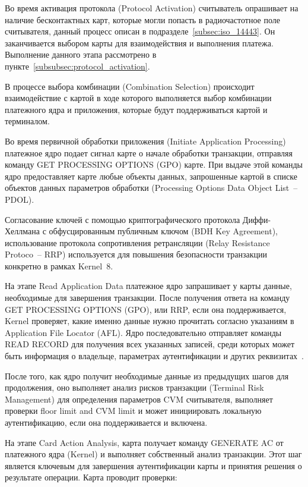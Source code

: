 Во время активация протокола (Protocol Activation) считыватель опрашивает на наличие бесконтактных карт, которые могли попасть в радиочастотное поле считывателя, данный процесс описан в подразделе~\ref{subsec:iso_14443}.
Он заканчивается выбором карты для взаимодействия и выполнения платежа.
Выполнение данного этапа рассмотрено в пункте~\ref{subsubsec:protocol_activation}.

В процессе выбора комбинации (Combination Selection) происходит взаимодействие с картой в ходе которого выполняется выбор комбинации платежного ядра и приложения, которые будут поддерживаться картой и терминалом.

Во время первичной обработки приложения (Initiate Application Processing) платежное ядро подает сигнал карте о начале обработки транзакции, отправляя команду GET PROCESSING OPTIONS (GPO) карте.
При выдаче этой команды ядро предоставляет карте любые объекты данных, запрошенные картой в списке объектов данных параметров обработки (Processing Options Data Object List~-- PDOL).

Согласование ключей с помощью криптографического протокола Диффи-Хеллмана с обфусцированным публичным ключом (BDH Key Agreement), использование протокола сопротивления ретрансляции (Relay Resistance Protoco~-- RRP) используется для повышения безопасности транзакции конкретно в рамках Kernel~8.

На этапе Read Application Data платежное ядро запрашивает у карты данные, необходимые для завершения транзакции.
После получения ответа на команду GET PROCESSING OPTIONS (GPO), или RRP, если она поддерживается, Kernel проверяет, какие именно данные нужно прочитать согласно указаниям в Application File Locator (AFL).
Ядро последовательно отправляет команды READ RECORD для получения всех указанных записей, среди которых может быть информация о владельце, параметрах аутентификации и других реквизитах~\cite{emv_book_c8}.

После того, как ядро получит необходимые данные из предыдущих шагов для продолжения, оно выполняет анализ рисков транзакции (Terminal Risk Management) для определения параметров CVM считывателя, выполняет проверки floor limit and CVM limit и может инициировать локальную аутентификацию, если она поддерживается и включена.

На этапе Card Action Analysis, карта получает команду GENERATE AC от платежного ядра (Kernel) и выполняет собственный анализ транзакции.
Этот шаг является ключевым для завершения аутентификации карты и принятия решения о результате операции.
Карта проводит проверки:


